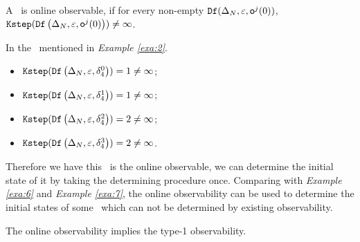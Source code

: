 
\begin{definition}
 A \BCN\ is online observable,
if for every non-empty ${\tt Df}(\Delta_N,\varepsilon, \mathsf{o}^{j}(0))$, ${\tt Kstep}({\tt Df}\left(\Delta_N,\varepsilon,\mathsf{o}^{j}(0)\right))\ne\infty$.
\end{definition}


\begin{example}
In the \BCN\ mentioned in {\em Example \ref{exa:2}}.  
 \begin{itemize}
 \item ${\tt Kstep}({\tt Df}\left(\Delta_N,\varepsilon, \delta_{4}^0\right))=1\ne \infty$;
 \item ${\tt Kstep}({\tt Df}\left(\Delta_N,\varepsilon, \delta_{4}^1\right))=1\ne \infty$;
 \item ${\tt Kstep}({\tt Df}\left(\Delta_N,\varepsilon, \delta_{4}^2\right))=2\ne \infty$;
 \item ${\tt Kstep}({\tt Df}\left(\Delta_N,\varepsilon, \delta_{4}^3\right))=2\ne \infty$.
 \end{itemize}
 
Therefore we have this \BCN\ is the online observable, we can determine the initial state of it by taking the determining procedure once. Comparing with {\em Example \ref{exa:6}} and {\em Example \ref{exa:7}}, the online observability can be used to determine the initial states of some \BCNs\ which can not be determined by existing observability. %
\label{exa:10}
\end{example}  

\begin{lemma}
The online observability implies the  type-1 observability.
\label{lemm:3}
\end{lemma}


